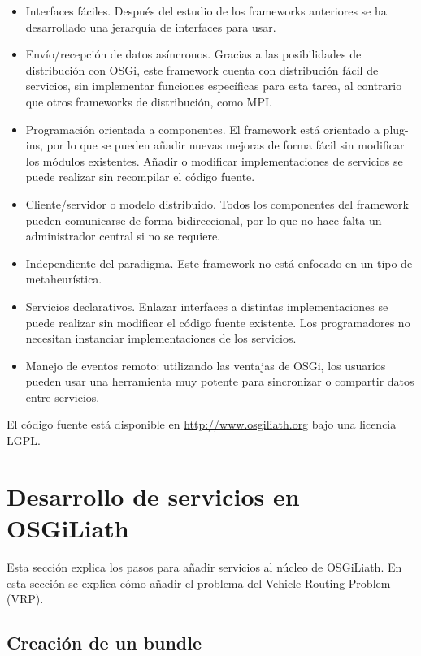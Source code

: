 \documentclass[runningheads]{llncs}
\begin{document}
\begin{itemize}
\item Interfaces fáciles. Después del estudio de los frameworks anteriores se ha desarrollado una jerarquía de interfaces para usar. 
\item Envío/recepción de datos asíncronos. Gracias a las posibilidades de distribución con OSGi, este framework cuenta con distribución fácil de servicios, sin implementar funciones específicas para esta tarea, al contrario que otros frameworks de distribución, como MPI.
\item Programación orientada a componentes. El framework está orientado a plug-ins, por lo que se pueden añadir nuevas mejoras de forma fácil sin modificar los módulos existentes. Añadir o modificar implementaciones de servicios se puede realizar sin recompilar el código fuente.
\item Cliente/servidor o modelo distribuido. Todos los componentes del framework pueden comunicarse de forma bidireccional, por lo que no hace falta un administrador central si no se requiere.
\item Independiente del paradigma. Este framework no está enfocado en un tipo de metaheurística.
\item Servicios declarativos. Enlazar interfaces a distintas implementaciones se puede realizar sin modificar el código fuente existente. Los programadores no necesitan instanciar implementaciones de los servicios.
\item Manejo de eventos remoto: utilizando las ventajas de OSGi, los usuarios pueden usar una herramienta muy potente para sincronizar o compartir datos entre servicios.
\end{itemize}

El código fuente está disponible en \url{http://www.osgiliath.org} bajo una licencia LGPL.

\section{Desarrollo de servicios en OSGiLiath}
\label{sec:development}

Esta sección explica los pasos para añadir servicios al núcleo de OSGiLiath. En esta sección se explica cómo añadir el problema del Vehicle Routing Problem (VRP).

\subsection{Creación de un bundle}
\end{document}
